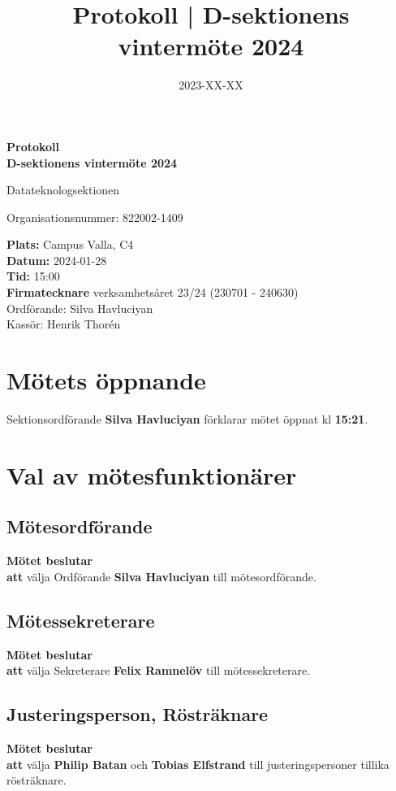 \documentclass{datateknologsektionen-document}
\title{Protokoll | D-sektionens vintermöte 2024}
\date{2023-XX-XX}
\newcommand{\ind}{\hspace*{2em}}
\newcommand{\motetbeslutar}{\textbf{Mötet beslutar}}
\newcommand{\att}{\\\ind\textbf{att}}
\begin{document}
\hspace{0pt}
\vfill
\begin{center}
	\Huge\textbf{Protokoll \\ D-sektionens vintermöte 2024}

	\huge Datateknologsektionen

	\large
	Organisationsnummer: 822002-1409

\end{center}
\vfill
{\large
	\textbf{Plats:} Campus Valla, C4 \\
	\textbf{Datum:} 2024-01-28 \\
	\textbf{Tid:} 15:00 \\
	\textbf{Firmatecknare} verksamhetsåret 23/24 (230701 - 240630) \\
	\ind Ordförande: Silva Havluciyan \\
	\ind Kassör: Henrik Thorén
}
\vfill
\hspace{0pt}
\pagebreak




\tableofcontents
\pagebreak





\section{Mötets öppnande}
Sektionsordförande \textbf{Silva Havluciyan} förklarar mötet öppnat kl \textbf{15:21}.




\section{Val av mötesfunktionärer}
\subsection{Mötesordförande}
\motetbeslutar\att{} välja Ordförande \textbf{Silva Havluciyan} till mötesordförande.

\subsection{Mötessekreterare}
\motetbeslutar\att{} välja Sekreterare \textbf{Felix Ramnelöv} till mötessekreterare.

\subsection{Justeringsperson, Rösträknare}
\motetbeslutar\att{} välja \textbf{Philip Batan} och \textbf{Tobias Elfstrand} till justeringspersoner tillika rösträknare.
\end{document}

